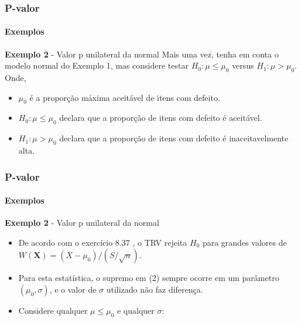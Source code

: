 \begin{frame}[c]
\frametitle{P-valor} 
\framesubtitle{Exemplos}
\begin{exampleblock}{\textbf{Exemplo 2} - Valor p unilateral da normal} %
Mais uma vez, tenha em conta o modelo normal do Exemplo 1, mas considere testar $H_{0}:\mu \leq \mu_{0}$ versus $H_{1}: \mu > \mu_{0}$. Onde,
\begin{itemize}
    \item $\mu_0$ é a proporção máxima aceitável de itens com defeito.
    \item $H_{0}:\mu \leq \mu_{0}$ declara que a proporção de itens com defeito é aceitável.
    \item $H_{1}: \mu > \mu_{0}$ declara que a proporção de itens com defeito é inaceitavelmente alta.
\end{itemize}
\end{exampleblock}
\end{frame}

\begin{frame}[c]
\frametitle{P-valor} 
\framesubtitle{Exemplos}
\begin{exampleblock}{\textbf{Exemplo 2} - Valor p unilateral da normal} %
\begin{itemize}
    \item De acordo com o exercício 8.37 \cite[p.~407]{casella}, o TRV rejeita $H_{0}$ para grandes valores de $W(\textbf{X})=(\overline{X}-\mu_{0})/(S/\sqrt{n})$.
    \item Para esta estatística, o supremo em (2) sempre ocorre em um parâmetro $(\mu_{0},\sigma)$, e o valor de $\sigma$ utilizado não faz diferença.
    \item Considere qualquer $\mu \leq \mu_{0}$ e qualquer $\sigma$:
\end{itemize}
\end{exampleblock}
\end{frame}

